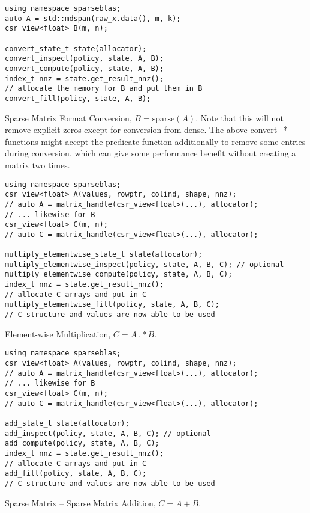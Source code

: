 \documentclass{article}
\begin{document}
\begin{listing}[H]
\begin{verbatim}
using namespace sparseblas;
auto A = std::mdspan(raw_x.data(), m, k);
csr_view<float> B(m, n);

convert_state_t state(allocator);
convert_inspect(policy, state, A, B);
convert_compute(policy, state, A, B);
index_t nnz = state.get_result_nnz();
// allocate the memory for B and put them in B
convert_fill(policy, state, A, B); 
\end{verbatim}
\caption{Sparse Matrix Format Conversion, $B = \text{sparse}(A)$. Note that this will not remove explicit zeros except for conversion from dense. The above convert\_* functions might accept the predicate function additionally to remove some entries during conversion, which can give some performance benefit without creating a matrix two times.}
\end{listing}



\begin{listing}[H]
\begin{verbatim}
using namespace sparseblas;
csr_view<float> A(values, rowptr, colind, shape, nnz);
// auto A = matrix_handle(csr_view<float>(...), allocator);
// ... likewise for B
csr_view<float> C(m, n);
// auto C = matrix_handle(csr_view<float>(...), allocator);

multiply_elementwise_state_t state(allocator);
multiply_elementwise_inspect(policy, state, A, B, C); // optional
multiply_elementwise_compute(policy, state, A, B, C);
index_t nnz = state.get_result_nnz();
// allocate C arrays and put in C
multiply_elementwise_fill(policy, state, A, B, C);
// C structure and values are now able to be used
\end{verbatim}
\caption{Element-wise Multiplication, $C = A~.*B$.}
\end{listing}


\begin{listing}[H]
\begin{verbatim}
using namespace sparseblas;
csr_view<float> A(values, rowptr, colind, shape, nnz);
// auto A = matrix_handle(csr_view<float>(...), allocator);
// ... likewise for B
csr_view<float> C(m, n);
// auto C = matrix_handle(csr_view<float>(...), allocator);

add_state_t state(allocator);
add_inspect(policy, state, A, B, C); // optional
add_compute(policy, state, A, B, C);
index_t nnz = state.get_result_nnz();
// allocate C arrays and put in C
add_fill(policy, state, A, B, C);
// C structure and values are now able to be used
\end{verbatim}
\caption{Sparse Matrix -- Sparse Matrix Addition, $C = A + B$.}
\end{listing}
\end{document}
